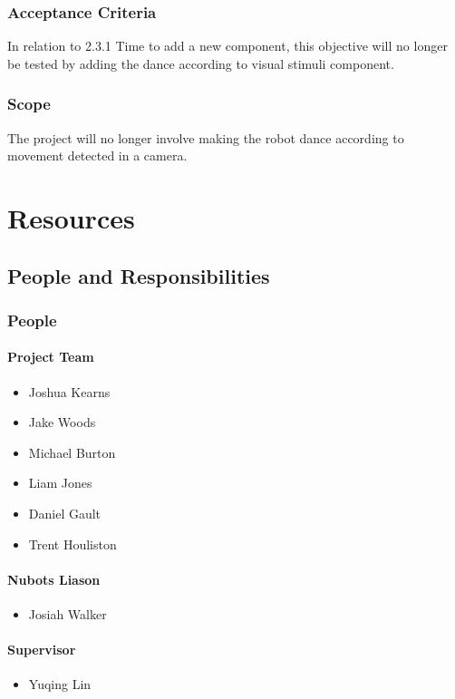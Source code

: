 \documentclass[english,12pt]{scrartcl}
\begin{document}
			\subsubsection{Acceptance Criteria}
				In relation to 2.3.1 Time to add a new component, this objective will no longer be tested by adding the dance according to visual stimuli component.
			
			\subsubsection{Scope}
				The project will no longer involve making the robot dance according to movement detected in a camera.

	\section{Resources}
		\subsection{People and Responsibilities}
			\subsubsection{People}
				\paragraph{Project Team}
					\begin{itemize}
						\item Joshua Kearns
						\item Jake Woods
						\item Michael Burton
						\item Liam Jones
						\item Daniel Gault
						\item Trent Houliston
					\end{itemize}
				\paragraph{Nubots Liason}
					\begin{itemize}
						\item Josiah Walker
					\end{itemize}
				\paragraph{Supervisor}
					\begin{itemize}
						\item Yuqing Lin
					\end{itemize}
\end{document}
